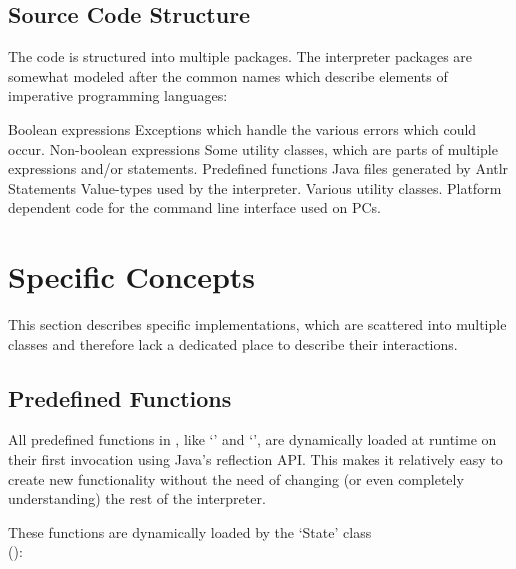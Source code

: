 \subsection{Source Code Structure}\label{srcStructure}

The code is structured into multiple packages. The interpreter packages are somewhat modeled after the common names which describe elements of imperative programming languages:

\begin{itemize}
			{Boolean expressions}
			{Exceptions which handle the various errors which could occur.}
			{Non-boolean expressions}
			{Some utility classes, which are parts of multiple expressions and\slash{}or statements.}
			{Predefined functions}
			{Java files generated by Antlr}
			{Statements}
			{Value-types used by the interpreter.}
			{Various utility classes.}
			{Platform dependent code for the command line interface used on PCs.}
\end{itemize}

\section{Specific Concepts}\label{specificConcepts}

This section describes specific implementations, which are scattered into multiple classes and therefore lack a dedicated place to describe their interactions.

\subsection{Predefined Functions}

All predefined functions in \setlX{}, like `' and `', are dynamically loaded at runtime on their first invocation using Java's reflection API. This makes it relatively easy to create new functionality without the need of changing (or even completely understanding) the rest of the interpreter.

These functions are dynamically loaded by the `State' class\\ ():

